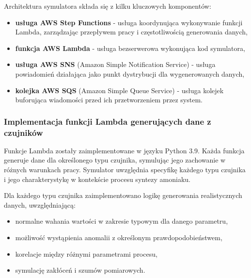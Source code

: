 Architektura symulatora składa się z kilku kluczowych komponentów:

\begin{itemize}
    \item \textbf{usługa AWS Step Functions} - usługa koordynująca wykonywanie funkcji Lambda, zarządzając przepływem pracy i częstotliwością generowania danych,
    \item \textbf{funkcja AWS Lambda} \cite{aws_lambda_docs} - usługa bezserwerowa wykonująca kod symulatora,
    \item \textbf{usługa AWS SNS} (Amazon Simple Notification Service) \cite{sns_docs} - usługa powiadomień działająca jako punkt dystrybucji dla wygenerowanych danych,
    \item \textbf{kolejka AWS SQS} (Amazon Simple Queue Service) \cite{sqs_docs} - usługa kolejek buforująca wiadomości przed ich przetworzeniem przez system.
\end{itemize}

%

\subsubsection{Implementacja funkcji Lambda generujących dane z czujników}
\label{subsubsec:implementacja_lambda}

Funkcje Lambda zostały zaimplementowane w języku Python 3.9. Każda funkcja generuje dane dla określonego typu czujnika,
symulując jego zachowanie w różnych warunkach pracy. Symulator uwzględnia specyfikę każdego typu czujnika i jego charakterystykę w kontekście procesu syntezy amoniaku.

\vspace{0.3em}

Dla każdego typu czujnika zaimplementowano logikę generowania realistycznych danych, uwzględniającą:
\begin{itemize}
    \item normalne wahania wartości w zakresie typowym dla danego parametru,
    \item możliwość wystąpienia anomalii z określonym prawdopodobieństwem,
    \item korelacje między różnymi parametrami procesu,
    \item symulację zakłóceń i szumów pomiarowych.
\end{itemize}